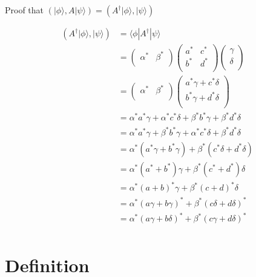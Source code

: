 \documentclass{article}
\begin{document}
Proof that $(|\phi\rangle, A|\psi\rangle) = (A^\dag|\phi\rangle, |\psi\rangle)$

\begin{equation}
    \begin{split}
        (A^\dag|\phi\rangle, |\psi\rangle) & = \langle\phi|A^\dag|\psi\rangle \\
        & = \begin{pmatrix}
            \alpha^* & \beta^* \\
        \end{pmatrix} \begin{pmatrix}
            a^* & c^* \\
            b^* & d^* \\
        \end{pmatrix} \begin{pmatrix}
            \gamma \\
            \delta \\
        \end{pmatrix} \\
        & = \begin{pmatrix}
            \alpha^* & \beta^* \\
        \end{pmatrix} \begin{pmatrix}
            a^*\gamma + c^*\delta \\
            b^*\gamma + d^*\delta \\
        \end{pmatrix} \\
        & = \alpha^*a^*\gamma + \alpha^*c^*\delta + \beta^*b^*\gamma + \beta^*d^*\delta \\
        & = \alpha^*a^*\gamma + \beta^*b^*\gamma + \alpha^*c^*\delta + \beta^*d^*\delta \\
        & = \alpha^*(a^*\gamma + b^*\gamma) + \beta^*(c^*\delta + d^*\delta) \\
        & = \alpha^*(a^* + b^*)\gamma + \beta^*(c^* + d^*)\delta \\
        & = \alpha^*(a + b)^*\gamma + \beta^*(c + d)^*\delta \\
        & = \alpha^*(a\gamma + b\gamma)^* + \beta^*(c\delta + d\delta)^* \\
        & = \alpha^*(a\gamma + b\delta)^* + \beta^*(c\gamma + d\delta)^* \\
    \end{split}
\end{equation}

\section{Definition}
\end{document}
